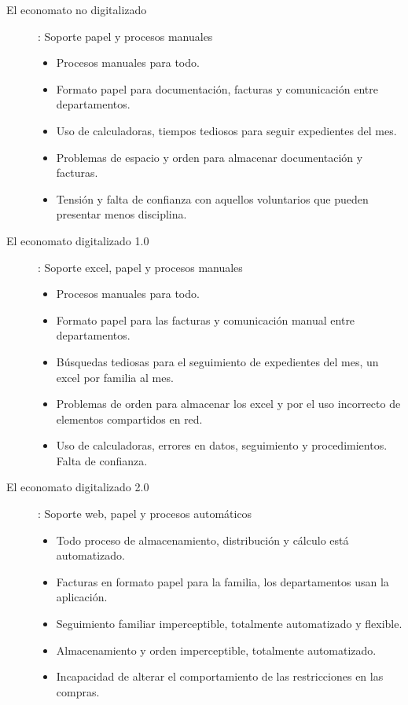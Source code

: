 \begin{description}
  \item[El economato no digitalizado]: Soporte papel y procesos manuales
  \begin{itemize}
      \item Procesos manuales para todo.
      \item Formato papel para documentación, facturas y comunicación entre departamentos.
      \item Uso de calculadoras, tiempos tediosos para seguir expedientes del mes.
      \item Problemas de espacio y orden para almacenar documentación y facturas.
      \item Tensión y falta de confianza con aquellos voluntarios que pueden presentar menos disciplina.
  \end{itemize}
  \item[El economato digitalizado 1.0]: Soporte excel, papel y procesos manuales
  \begin{itemize}
      \item Procesos manuales para todo.
      \item Formato papel para las facturas y comunicación manual entre departamentos.
      \item Búsquedas tediosas para el seguimiento de expedientes del mes, un excel por familia al mes.
      \item Problemas de orden para almacenar los excel y por el uso incorrecto de elementos compartidos en red.
      \item Uso de calculadoras, errores en datos, seguimiento y procedimientos. Falta de confianza.
  \end{itemize}
  \item[El economato digitalizado 2.0]: Soporte web, papel y procesos automáticos
  \begin{itemize}
      \item Todo proceso de almacenamiento, distribución y cálculo está automatizado.
      \item Facturas en formato papel para la familia, los departamentos usan la aplicación.
      \item Seguimiento familiar imperceptible, totalmente automatizado y flexible.
      \item Almacenamiento y orden imperceptible, totalmente automatizado.
      \item Incapacidad de alterar el comportamiento de las restricciones en las compras.
  \end{itemize}
\end{description}
\clearpage
